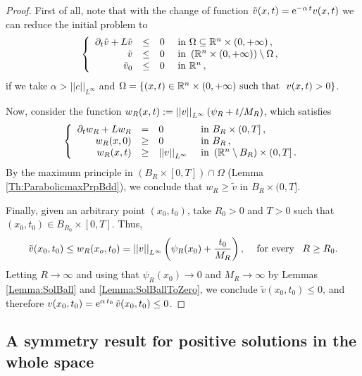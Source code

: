 \begin{proof}
First of all, note that with the change of function $\tilde{v}(x,t) = \mathrm{e}^{-\alpha\,t} v(x,t)$ we can reduce the initial problem to
\begin{equation*}
\left\{\begin{array}{rcll}
\partial_t \tilde{v} + L \tilde{v} &\leq& 0 & \textrm{ in } \Omega \subseteq\mathbb{R}^n\times(0,+\infty)\,,\\
\tilde{v} &\leq& 0 & \textrm{ in }  \left(\mathbb{R}^n\times(0,+\infty)\right) \setminus  \Omega\,,\\
\tilde{v}_0 &\leq& 0 & \textrm{ in } \mathbb{R}^n\,,
\end{array} \right.
\end{equation*}
if we take $\alpha > ||c||_{L^\infty}$ and $\Omega = \{(x,t)\in \mathbb{R}^n\times(0,+\infty) \ \textrm{such that } \ v(x,t) > 0\}$.

Now, consider the function $ w_R(x,t) := \left | \left |{v} \right | \right |_{L^\infty} ( \psi_R + t/M_R )$, which satisfies
\begin{equation*}
\left\{\begin{array}{rcll}
\partial_t w_R + L w_R &=& 0 & \textrm{ in }B_R\times(0,T]\,,\\
w_R(x,0) &\geq& 0 & \textrm{ in } B_R\,,\\
w_R(x,t) &\geq& \left | \left |{v} \right | \right |_{L^\infty}  & \textrm{ in } \left( \mathbb{R}^n\setminus B_R\right) \times (0,T] \,.
\end{array} \right.
\end{equation*}
By the maximum principle in $(B_R\times[0,T])\cap \Omega$ (Lemma \ref{Th:ParabolicmaxPrpBdd}), we conclude that $ w_R\geq \tilde{v} $ in $B_R\times(0,T]$.

Finally, given an arbitrary point $(x_0,t_0)$, take $R_0>0$ and $T>0$ such that $(x_0,t_0)\in B_{R_0}\times [0,T]$. Thus,
$$ \tilde{v}(x_0,t_0) \leq w_R(x_o,t_0) = \left | \left |{v} \right | \right |_{L^\infty} \left(  \psi_R(x_0) + \frac{t_0}{M_R} \right), \,\,\,\,\,\text{ for every }\,\,\, R\geq R_0.
$$
Letting $R \to \infty$ and using that $\psi_R(x_0) \to 0$ and $M_R \to \infty$ by Lemmas \ref{Lemma:SolBall} and \ref{Lemma:SolBallToZero}, we conclude $ \tilde{v}(x_0,t_0) \leq  0$, and therefore $ v(x_0,t_0) = \mathrm{e}^{\alpha\,t_0}\,\tilde{v}(x_0,t_0) \leq 0$.
\end{proof}


\subsection{A symmetry result for positive solutions in the whole space}



